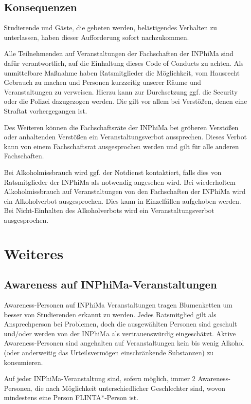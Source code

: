 \documentclass{article}
\begin{document}
\subsection{Konsequenzen}
Studierende und Gäste, die gebeten werden, belästigendes Verhalten zu unterlassen, haben dieser Aufforderung sofort nachzukommen.

Alle Teilnehmenden auf Veranstaltungen der Fachschaften der INPhiMa sind dafür verantwortlich, auf die Einhaltung dieses Code of Conducts zu achten. Als unmittelbare Maßnahme haben Ratsmitglieder die Möglichkeit, vom Hausrecht Gebrauch zu machen und Personen kurzzeitig unserer Räume und Veranstaltungen zu verweisen. Hierzu kann zur Durchsetzung ggf. die Security oder die Polizei dazugezogen werden. Die gilt vor allem bei Verstößen, denen eine Straftat vorhergegangen ist.
 
Des Weiteren können die Fachschaftsräte der INPhiMa bei gröberen Verstößen oder anhaltenden Verstö\-ßen ein Veranstaltungsverbot aussprechen. Dieses Verbot kann von einem Fachschaftsrat ausgesprochen werden und gilt für alle anderen Fachschaften. 

Bei Alkoholmissbrauch wird ggf. der Notdienst kontaktiert, falls dies von Ratsmitglieder der INPhiMa als notwendig angesehen wird. Bei wiederholtem Alkoholmissbrauch auf Veranstaltungen von den Fachschaften der INPhiMa wird ein Alkoholverbot ausgesprochen. Dies kann in Einzelfällen aufgehoben werden. Bei Nicht-Einhalten des Alkoholverbots wird ein Veranstaltungsverbot ausgesprochen.

\section{Weiteres}

\subsection{Awareness auf INPhiMa-Veranstaltungen}
Awareness-Personen auf INPhiMa Veranstaltungen tragen Blumenketten um besser von Studierenden erkannt zu werden. Jedes Ratsmitglied gilt als Ansprechperson bei Problemen, doch die ausgewählten Personen sind geschult und/oder werden von der INPhiMa als vertrauenswürdig eingeschätzt. Aktive Awareness-Personen sind angehalten auf Veranstaltungen kein bis wenig Alkohol (oder anderweitig das Urteilsvermögen einschränkende Substanzen) zu konsumieren.

Auf jeder INPhiMa-Veranstaltung sind, sofern möglich, immer 2 Awareness-Personen, die nach Mög\-lich\-keit unterschiedlicher Geschlechter sind, wovon mindestens eine Person FLINTA*-Person ist. %
\end{document}
